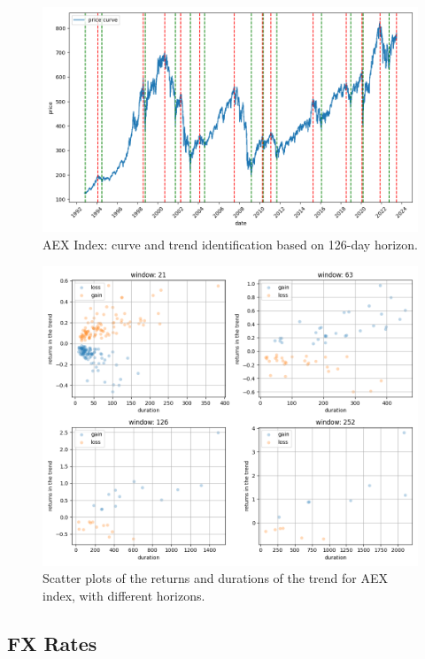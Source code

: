 \begin{figure}[h]
	\centering
	\includegraphics[width=0.8\linewidth]{chapters/chapter1/figures/curve_AEX_126D}
	\caption{AEX Index: curve and trend identification based on 126-day horizon.}
	\label{fig:curveaex126d}
\end{figure}

\begin{figure}[h]
	\centering
	\includegraphics[width=1\linewidth]{chapters/chapter1/figures/scatter_AEX}
	\caption{Scatter plots of the returns and durations of the trend for AEX index, with different horizons.}
	\label{fig:scatteraex}
\end{figure}


\subsection{FX Rates}


